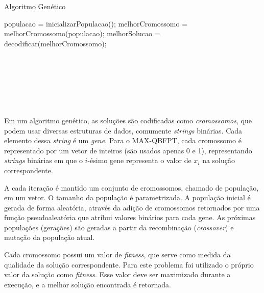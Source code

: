 \documentclass{MO824}
\begin{document}
\begin{algorithm}[H]
		\label{alg_gen}
		\caption{Algoritmo Genético}
		\begin{algorithmic}[1]
		    \STATE populacao = inicializarPopulacao();
		    \STATE melhorCromossomo = melhorCromossomo(populacao);
		    \STATE melhorSolucao = decodificar(melhorCromossomo);\\
		    
		        \\
		        \\
		        \\
		        \\
		        \\
		        \\
		       \ENDIF
		       \ENDIF
		  \ENDFOR
		  
		\end{algorithmic}
	\end{algorithm}

Em um algoritmo genético, as soluções são codificadas como \textit{cromossomos}, que podem usar diversas estruturas de dados, comumente \textit{strings} binárias. Cada elemento dessa \textit{string} é um \textit{gene}. Para o MAX-QBFPT, cada cromossomo é representado por um vetor de inteiros (são usados apenas 0 e 1), representando \textit{strings} binárias em que o $i$-ésimo gene representa o valor de $x_i$ na solução correspondente. 

A cada iteração é mantido um conjunto de cromossomos, chamado de população, em um vetor. O tamanho da população é parametrizada. A população inicial é gerada de forma aleatória, através da adição de cromossomos retornados por uma função pseudoaleatória que atribui valores binários para cada gene. As próximas populações (gerações) são geradas a partir da recombinação (\textit{crossover}) e mutação da população atual.

Cada cromossomo possui um valor de \textit{fitness}, que serve como medida da qualidade da solução correspondente. Para este problema foi utilizado o próprio valor da solução como \textit{fitness}. Esse valor deve ser maximizado durante a execução, e a melhor solução encontrada é retornada.
\end{document}
